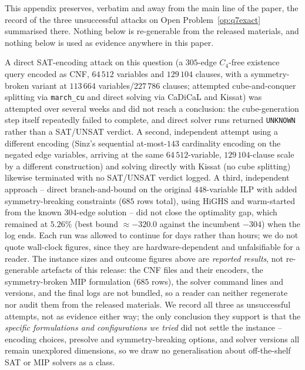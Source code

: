 \documentclass[12pt,a4paper]{article}
\theoremstyle{definition}
\begin{document}
This appendix preserves, verbatim and away from the main line of
the paper, the record of the three unsuccessful attacks on Open
Problem~\ref{op:q7exact} summarised there. Nothing below is
re-generable from the released materials, and nothing below is
used as evidence anywhere in this paper.

A direct SAT-encoding attack on this question (a $305$-edge
    $C_4$-free existence query encoded as CNF, $64\,512$ variables and
    $129\,104$ clauses, with a symmetry-broken variant at $113\,664$
    variables/$227\,786$ clauses; attempted cube-and-conquer splitting
    via \texttt{march\_cu} and direct solving via CaDiCaL and Kissat)
    was attempted over several weeks and did not reach a conclusion:
    the cube-generation step itself repeatedly failed to complete, and
    direct solver runs returned \texttt{UNKNOWN} rather than a
    SAT/UNSAT verdict. A second, independent attempt using a different
    encoding (Sinz's sequential at-most-$143$ cardinality encoding on
    the negated edge variables, arriving at the same
    $64\,512$-variable, $129\,104$-clause scale by a different
    construction) and solving directly with Kissat (no cube splitting)
    likewise terminated with no SAT/UNSAT verdict logged. A third,
    independent approach -- direct branch-and-bound on the original
    $448$-variable ILP with added symmetry-breaking constraints
    ($685$ rows total), using HiGHS and warm-started from the known
    $304$-edge solution -- did not close the optimality gap, which
    remained at $5.26\%$ (best bound $\approx-320.0$ against the
    incumbent $-304$) when the log ends. Each run was allowed to
    continue for days rather than hours; we do not quote wall-clock
    figures, since they are hardware-dependent and unfalsifiable for a
    reader. The instance sizes and outcome figures above are
    \emph{reported results}, not re-generable artefacts of this
    release: the CNF files and their encoders, the symmetry-broken MIP
    formulation ($685$ rows), the solver command lines and versions,
    and the final logs are not bundled, so a reader can neither
    regenerate nor audit them from the released materials. We record
    all three as unsuccessful attempts, not as evidence either way;
    the only conclusion they support is that the \emph{specific
    formulations and configurations we tried} did not settle the
    instance -- encoding choices, presolve and symmetry-breaking
    options, and solver versions all remain unexplored dimensions, so
    we draw no generalisation about off-the-shelf SAT or MIP solvers
    as a class.
\end{document}
